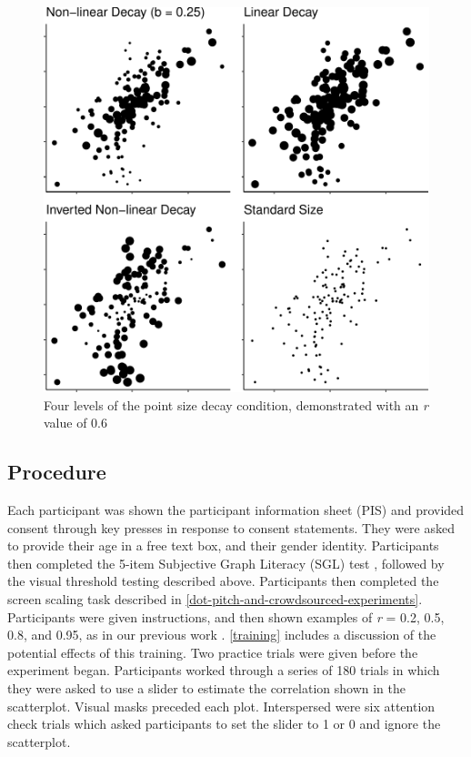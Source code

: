 \documentclass{vgtc}                          %
\begin{document}
\begin{figure}
\includegraphics[width=1\linewidth]{size_and_scatterplots_files/figure-latex/examples-1} \caption{Four levels of the point size decay condition, demonstrated with an \textit{r} value of 0.6}\label{fig:examples}
\end{figure}

\hypertarget{procedure}{%
\subsection{Procedure}\label{procedure}}

Each participant was shown the participant information sheet (PIS) and provided
consent through key presses in response to consent statements. They were asked
to provide their age in a free text box, and their gender identity. Participants
then completed the 5-item Subjective Graph Literacy (SGL) test \cite{garcia_2016},
followed by the visual threshold testing described above. Participants then completed
the screen scaling task described in \autoref{dot-pitch-and-crowdsourced-experiments}.
Participants were given instructions, and then shown examples of \emph{r} = 0.2, 0.5, 0.8, and
0.95, as in our previous work \cite{strain_2023}. \autoref{training} includes
a discussion of the potential effects of this training. Two practice trials were
given before the experiment began. Participants worked through a series of 180 trials
in which they were asked to use a slider to estimate the correlation shown in
the scatterplot. Visual masks preceded each plot. Interspersed were six attention check trials which asked
participants to set the slider to 1 or 0 and ignore the scatterplot.
\end{document}
